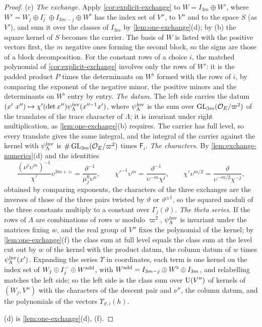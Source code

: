 \begin{proof}
(c) \emph{The exchange.} Apply \cref{cor:explicit-exchange} to $W=I_{3m}\oplus W'$, where $W'=W_j\oplus I_j^-\oplus I_{3m-j}\oplus W^\flat$ has the index set of $V''$, to $V''$ and to the space $S$ (as $V'$), and sum it over the classes of $I_{3m}$ by
\cref{lem:one-exchange}(d); by (b) the square kernel of $S$ becomes the carrier. The basis of $W$ is listed with the positive vectors first, the $m$ negative ones forming the second block, so the signs are those of a block
decomposition. For the constant rows of a choice $i$, the matched polynomial of \cref{cor:explicit-exchange} involves only the rows of $W'$: it is the padded product $P$ times the determinants on $W^\flat$ formed with the rows of $i$, by
comparing the exponent of the negative minor, the positive minors and the determinants on $W^\flat$ entry by entry. \emph{The datum.} The left side carries the datum $(x'\ x'')\mapsto\chi'(\det x'')\psi^{\rm inv}_\Lambda(x''^{-1}x')$, where
$\psi^{\rm inv}_\Lambda$ is the sum over $\operatorname{GL}_{3m}(\mathcal{O}_E/\varpi^2)$ of the translates of the trace character of $\Lambda$; it is invariant under right multiplication, as \cref{lem:one-exchange}(b) requires. The carrier has full level, so every translate
gives the same integral, and the integral of the carrier against the kernel with $\psi^{\rm inv}_\Lambda$ is $\#\operatorname{GL}_{3m}(\mathcal{O}_E/\varpi^2)$ times $\mathsf F_i$. \emph{The characters.} By \cref{lem:exchange-numerics}(d) and the identities
\[
  \frac{(\nu^\flat\upsilon^m)^{-1}}{\chi'}\upsilon^{3m+z_*}=\frac{\vartheta^{-1}}{\mu^0_j\upsilon^n},\qquad\chi'^{-1}\upsilon^m=\frac{\vartheta^{-1}}{\upsilon^{-m}\chi^j},\qquad\chi'\upsilon^{m/2}=\frac{\vartheta}{\upsilon^{-m/2}\chi^{-j}},
\]
obtained by comparing exponents, the characters of the three exchanges are the inverses of those of the three pairs twisted by $\vartheta$ or $\vartheta^{\pm1}$, so the squared moduli of the three constants multiply to a constant over
$\Gamma_j(\vartheta)$. \emph{The theta series.} If the rows of $\Lambda$ are combinations of rows $w$ modulo $\varpi^2$, $\psi^{\rm inv}_\Lambda$ is invariant under the matrices fixing $w$, and the real group of $V''$ fixes the polynomial of the kernel;
by \cref{lem:one-exchange}(f) the class sum at full level equals the class sum at the level cut out by $w$ of the kernel with the product datum, the column datum of $w$ times $\psi^{\rm inv}_\Lambda(x')$. Expanding the series $\Upsilon$ in
coordinates, each term is one kernel on the index set of $W_j\oplus I_j^-\oplus W^{\rm add}$, with $W^{\rm add}=I_{3m-j}\oplus W^\flat\oplus I_{3m}$, and relabelling matches the left side; so the left side is the class sum over $\operatorname{U}(V'')$ of kernels of
$(W_j,V'')$ with the characters of the descent pair and $\nu''$, the column datum, and the polynomials of the vectors $\Upsilon_{\vartheta,i}(h)$.

(d) is \cref{lem:one-exchange}(d), (f).
\end{proof}

